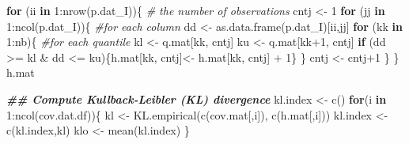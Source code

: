 \documentclass[
  10pt,
  b5paper,
  oneside]{book}
\newenvironment{Shaded}{\begin{snugshade}}{\end{snugshade}}
\newcommand{\CommentTok}[1]{\textcolor[rgb]{0.56,0.35,0.01}{\textit{#1}}}
\newcommand{\ControlFlowTok}[1]{\textcolor[rgb]{0.13,0.29,0.53}{\textbf{#1}}}
\newcommand{\DecValTok}[1]{\textcolor[rgb]{0.00,0.00,0.81}{#1}}
\newcommand{\DocumentationTok}[1]{\textcolor[rgb]{0.56,0.35,0.01}{\textbf{\textit{#1}}}}
\newcommand{\FunctionTok}[1]{\textcolor[rgb]{0.00,0.00,0.00}{#1}}
\newcommand{\NormalTok}[1]{#1}
\newcommand{\OtherTok}[1]{\textcolor[rgb]{0.56,0.35,0.01}{#1}}
\newcommand{\SpecialCharTok}[1]{\textcolor[rgb]{0.00,0.00,0.00}{#1}}
\begin{document}
\begin{Shaded}
\begin{Highlighting}[]
    \ControlFlowTok{for}\NormalTok{ (ii }\ControlFlowTok{in} \DecValTok{1}\SpecialCharTok{:}\FunctionTok{nrow}\NormalTok{(p.dat\_I))\{ }\CommentTok{\# the number of observations}
\NormalTok{      cntj }\OtherTok{\textless{}{-}} \DecValTok{1} 
      \ControlFlowTok{for}\NormalTok{ (jj }\ControlFlowTok{in} \DecValTok{1}\SpecialCharTok{:}\FunctionTok{ncol}\NormalTok{(p.dat\_I))\{ }\CommentTok{\#for each column}
\NormalTok{        dd }\OtherTok{\textless{}{-}} \FunctionTok{as.data.frame}\NormalTok{(p.dat\_I)[ii,jj]  }
        \ControlFlowTok{for}\NormalTok{ (kk }\ControlFlowTok{in} \DecValTok{1}\SpecialCharTok{:}\NormalTok{nb)\{  }\CommentTok{\#for each quantile}
\NormalTok{          kl }\OtherTok{\textless{}{-}}\NormalTok{ q.mat[kk, cntj] }
\NormalTok{          ku }\OtherTok{\textless{}{-}}\NormalTok{ q.mat[kk}\SpecialCharTok{+}\DecValTok{1}\NormalTok{, cntj] }
          \ControlFlowTok{if}\NormalTok{ (dd }\SpecialCharTok{\textgreater{}=}\NormalTok{ kl }\SpecialCharTok{\&}\NormalTok{ dd }\SpecialCharTok{\textless{}=}\NormalTok{ ku)\{h.mat[kk, cntj]}\OtherTok{\textless{}{-}}\NormalTok{ h.mat[kk, cntj] }\SpecialCharTok{+} \DecValTok{1}\NormalTok{\}}
\NormalTok{        \}}
\NormalTok{        cntj }\OtherTok{\textless{}{-}}\NormalTok{ cntj}\SpecialCharTok{+}\DecValTok{1}
\NormalTok{      \}}
\NormalTok{    \}}
\NormalTok{    h.mat }
    
    
    \DocumentationTok{\#\# Compute Kullback{-}Leibler (KL) divergence}
\NormalTok{    kl.index }\OtherTok{\textless{}{-}} \FunctionTok{c}\NormalTok{()}
    \ControlFlowTok{for}\NormalTok{(i }\ControlFlowTok{in} \DecValTok{1}\SpecialCharTok{:}\FunctionTok{ncol}\NormalTok{(cov.dat.df))\{}
\NormalTok{      kl }\OtherTok{\textless{}{-}} \FunctionTok{KL.empirical}\NormalTok{(}\FunctionTok{c}\NormalTok{(cov.mat[,i]), }\FunctionTok{c}\NormalTok{(h.mat[,i]))}
\NormalTok{      kl.index }\OtherTok{\textless{}{-}} \FunctionTok{c}\NormalTok{(kl.index,kl)}
\NormalTok{      klo }\OtherTok{\textless{}{-}}  \FunctionTok{mean}\NormalTok{(kl.index)}
\NormalTok{    \}}
  

\end{Highlighting}
\end{Shaded}
\end{document}
